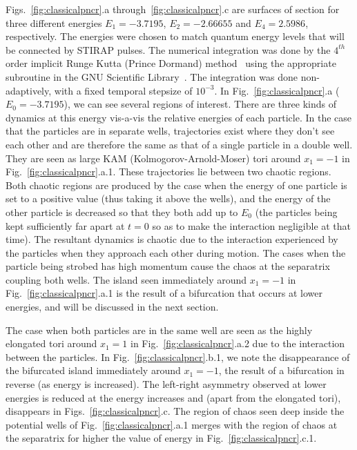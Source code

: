 \documentclass{article}
\begin{document}
Figs.~\ref{fig:classicalpncr}.a through~\ref{fig:classicalpncr}.c are surfaces of section for three different energies $E_1 = -3.7195$, $E_2 = -2.66655$ and $E_4 = 2.5986$, respectively. The energies were chosen to match quantum energy levels that will be connected by STIRAP pulses. The numerical integration was done by the $4^{th}$ order implicit Runge Kutta (Prince Dormand) method~\cite{rkutta:pd} using the appropriate subroutine in the GNU Scientific Library~\cite{galassi:gsl}. The integration was done non-adaptively, with a fixed temporal stepsize of $10^{-3}$.
In Fig.~\ref{fig:classicalpncr}.a ($E_0 = -3.7195$), we can see several regions of interest. There are three  kinds of dynamics at this energy vis-a-vis the relative energies of each particle. In the case that the particles are in separate wells, trajectories exist where they don't see each other and are therefore the same as that of a single particle in a double well. They are seen as large KAM (Kolmogorov-Arnold-Moser) tori around $x_1 = -1$ in Fig.~\ref{fig:classicalpncr}.a.1. These trajectories lie between two chaotic regions. Both chaotic regions are produced by the case when the energy of one particle is set to a positive value (thus taking it above the wells), and the energy of the other particle is decreased so that they both add up to $E_0$ (the particles being kept sufficiently far apart at $t=0$ so as to make the interaction negligible at that time). The resultant dynamics is chaotic due to the interaction experienced by the particles when they approach each other during motion. The cases when the particle being strobed has high momentum cause the chaos at the separatrix coupling both wells.
The island seen immediately around $x_1 = -1$ in Fig.~\ref{fig:classicalpncr}.a.1 is the result of a bifurcation that occurs at lower energies, and will be discussed in the next section.

The case when both particles are in the same well are seen as the highly elongated tori around $x_1 = 1$ in Fig.~\ref{fig:classicalpncr}.a.2 due to the interaction between the particles. In Fig.~\ref{fig:classicalpncr}.b.1, we note the disappearance of the bifurcated island immediately around $x_1 = -1$, the result of a bifurcation in reverse (as energy is increased).  The left-right asymmetry observed at lower energies is  reduced at the energy increases and (apart from the elongated tori), disappears in Figs.~\ref{fig:classicalpncr}.c.  The region of chaos seen deep  inside  the potential  wells of Fig.~\ref{fig:classicalpncr}.a.1 merges with the region of chaos at the separatrix for higher the value of energy in Fig.~\ref{fig:classicalpncr}.c.1. 
\end{document}
